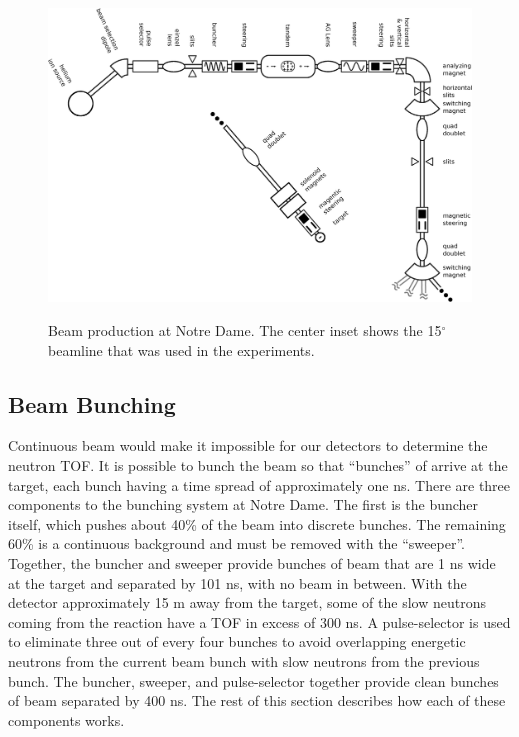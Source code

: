 \begin{figure}[htp]
\centering
\includegraphics[width=1.0\textwidth]{figures/NSL_beamline.eps}
\label{fig:beamline}
\caption{Beam production at Notre Dame.  The center inset shows the 15$^{\circ}$ beamline that was used in the experiments.}
\end{figure}

\subsection{Beam Bunching}

Continuous beam would make it impossible for our detectors to determine the neutron TOF.  It is possible to bunch the beam so that ``bunches'' of  arrive at the target, each bunch having a time spread of approximately one ns. There are three components to the bunching system at Notre Dame.  The first is the buncher itself, which pushes about 40\% of the beam into discrete bunches.  The remaining 60\% is a continuous background and must be removed with the ``sweeper''.  Together, the buncher and sweeper provide bunches of beam that are 1 ns wide at the target and separated by 101 ns, with no beam in between.  With the detector approximately 15 m away from the target, some of the slow neutrons coming from the reaction have a TOF in excess of 300 ns.  A pulse-selector is used to eliminate three out of every four bunches to avoid overlapping energetic neutrons from the current beam bunch with slow neutrons from the previous bunch.  The buncher, sweeper, and pulse-selector together provide clean bunches of beam separated by 400 ns.  The rest of this section describes how each of these components works.

